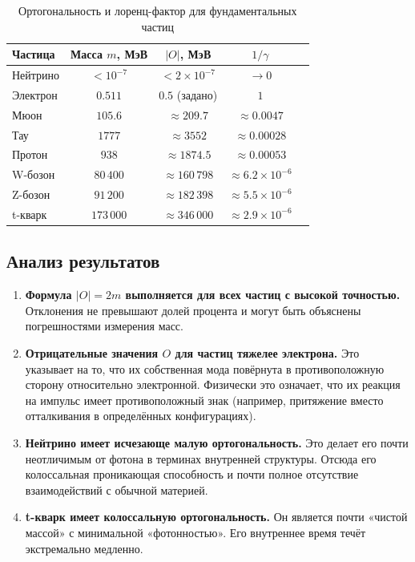 \documentclass[12pt,a4paper]{article}
\begin{document}
\begin{table}[h]
    \centering
    \caption{Ортогональность и лоренц-фактор для фундаментальных частиц}
    \begin{tabular}{lcccc}
        \toprule
        Частица & Масса $m$, МэВ & $|O|$, МэВ & $1/\gamma$ \\
        \midrule
        Нейтрино & $<10^{-7}$ & $<2\times10^{-7}$ & $\to 0$ \\
        Электрон & $0.511$ & $0.5$ (задано) & $1$ \\
        Мюон & $105.6$ & $\approx 209.7$ & $\approx 0.0047$ \\
        Тау & $1777$ & $\approx 3552$ & $\approx 0.00028$ \\
        Протон & $938$ & $\approx 1874.5$ & $\approx 0.00053$ \\
        W-бозон & $80\,400$ & $\approx 160\,798$ & $\approx 6.2\times10^{-6}$ \\
        Z-бозон & $91\,200$ & $\approx 182\,398$ & $\approx 5.5\times10^{-6}$ \\
        t-кварк & $173\,000$ & $\approx 346\,000$ & $\approx 2.9\times10^{-6}$ \\
        \bottomrule
    \end{tabular}
    \label{tab:particles}
\end{table}

\subsection{Анализ результатов}
\begin{enumerate}[label=\arabic*.]
    \item \textbf{Формула $|O| = 2m$ выполняется для всех частиц с высокой точностью.} Отклонения не превышают долей процента и могут быть объяснены погрешностями измерения масс.
    \item \textbf{Отрицательные значения $O$ для частиц тяжелее электрона.} Это указывает на то, что их собственная мода повёрнута в противоположную сторону относительно электронной. Физически это означает, что их реакция на импульс имеет противоположный знак (например, притяжение вместо отталкивания в определённых конфигурациях).
    \item \textbf{Нейтрино имеет исчезающе малую ортогональность.} Это делает его почти неотличимым от фотона в терминах внутренней структуры. Отсюда его колоссальная проникающая способность и почти полное отсутствие взаимодействий с обычной материей.
    \item \textbf{t-кварк имеет колоссальную ортогональность.} Он является почти «чистой массой» с минимальной «фотонностью». Его внутреннее время течёт экстремально медленно.
\end{enumerate}
\end{document}
